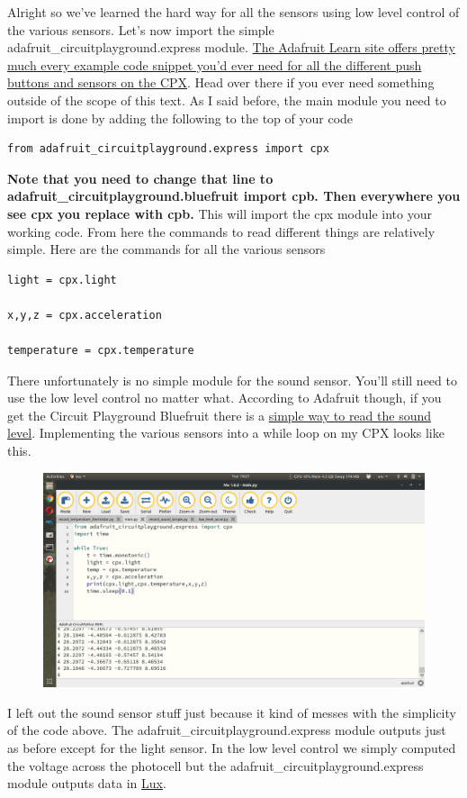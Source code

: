 {Alright so we’ve learned the hard way for all the sensors using low
level control of the various sensors. Let’s now import the simple
adafruit\_circuitplayground.express
module. \href{https://learn.adafruit.com/circuitpython-made-easy-on-circuit-playground-express/circuit-playground-express-library}{The
Adafruit Learn site offers pretty much every example code snippet
you’d ever need for all the different push buttons and sensors on the
CPX}. Head over there if you ever need something outside of the scope
of this text. As I said before, the main module you need to import is
done by adding the following to the top of your code 
\begin{verbatim}
from adafruit_circuitplayground.express import cpx
\end{verbatim}
{\bf Note that you need to change that line to adafruit\_circuitplayground.bluefruit import cpb. Then everywhere you see cpx you replace with cpb.}
This will import the cpx module into your working code. From here the
commands to read different things are relatively simple. Here are the
commands for all the various sensors 
\begin{verbatim}
light = cpx.light

x,y,z = cpx.acceleration

temperature = cpx.temperature
\end{verbatim}

There unfortunately is no simple module for the sound sensor. You’ll
still need to use the low level control no matter what. According to
Adafruit though, if you get the Circuit Playground Bluefruit there is
a \href{https://learn.adafruit.com/circuitpython-made-easy-on-circuit-playground-express/sound}{simple
way to read the sound level}. Implementing the various sensors into a
while loop on my CPX looks like this. 
\begin{figure}[H]
  \begin{center}
    \includegraphics[width=\textwidth]{Figures/high_level_mu.png}
  \end{center}
\end{figure}
I left out the sound sensor stuff just because it kind of messes with
the simplicity of the code above. The
adafruit\_circuitplayground.express module outputs just as before
except for the light sensor. In the low level control we simply
computed the voltage across the photocell but the
adafruit\_circuitplayground.express module outputs data
in \href{https://en.wikipedia.org/wiki/Lux}{Lux}. 

}

